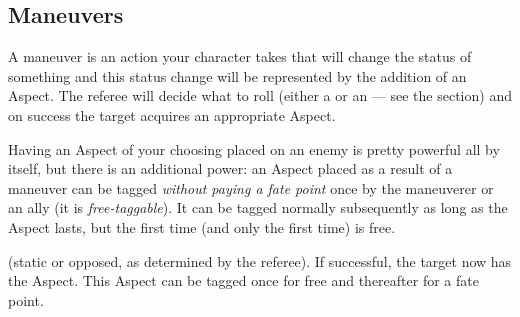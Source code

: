 

\subsection{Maneuvers}\label{sec:maneuvers} %

A maneuver is an action your character takes that will change the status of something and this status change will be represented by the addition of an Aspect. The referee will decide what to roll (either a  or an  --- see the  section) and on success the target acquires an appropriate Aspect.

Having an Aspect of your choosing placed on an enemy is pretty powerful all by itself, but there is an additional power: an Aspect placed as a result of a maneuver can be tagged \emph{without paying a fate point} once by the maneuverer or an ally (it is \emph{free-taggable}). It can be tagged normally subsequently as long as the Aspect lasts, but the first time (and only the first time) is free.

(static or opposed, as determined by the referee). If successful, the target now has the Aspect. This Aspect can be tagged once for free and thereafter for a fate point.

